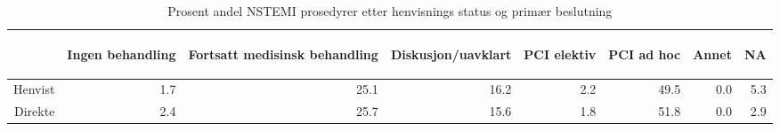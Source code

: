 \documentclass[presentation,xcolor=pdftex,dvipsnames,table]{beamer}
\begin{document}
\begin{frame}
\begin{tiny}
\begin{table}[ht]
\centering
\begin{tabular}{rrrrrrrr}
  \toprule
 & \begin{sideways} Ingen behandling \end{sideways} & \begin{sideways} Fortsatt medisinsk behandling \end{sideways} & \begin{sideways} Diskusjon/uavklart \end{sideways} & \begin{sideways} PCI elektiv \end{sideways} & \begin{sideways} PCI ad hoc \end{sideways} & \begin{sideways} Annet \end{sideways} & \begin{sideways} NA \end{sideways} \\ 
  \midrule
Henvist & 1.7 & 25.1 & 16.2 & 2.2 & 49.5 & 0.0 & 5.3 \\ 
  Direkte & 2.4 & 25.7 & 15.6 & 1.8 & 51.8 & 0.0 & 2.9 \\ 
   \bottomrule
\end{tabular}
\caption{Prosent andel NSTEMI prosedyrer etter henvisnings status og primær beslutning} 
\end{table}\end{tiny}
\end{frame}
\end{document}
